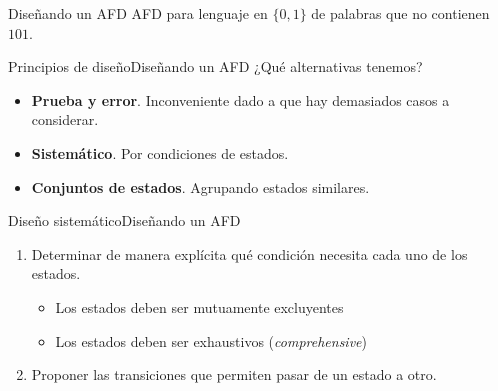 \documentclass[spanish]{beamer}
\newcommand\blfootnote[1]{%
  \begingroup
  \renewcommand\thefootnote{}\footnote{#1}%
  \addtocounter{footnote}{-1}%
  \endgroup
}
\begin{document}
\begin{frame}{Diseñando un AFD}
    AFD para lenguaje en $\{0, 1\}$ de palabras que no contienen $101$.

    \bigskip

    \begin{center}
    \end{center}
\end{frame}

\begin{frame}{Principios de diseño}{Diseñando un AFD}
    ¿Qué alternativas tenemos? \pause

    \begin{itemize}
        \itemsep1.5ex
        \item \textbf{Prueba y error}. Inconveniente dado a que hay demasiados casos a considerar. \pause
        \item \textbf{Sistemático}. Por condiciones de estados. \pause
        \item \textbf{Conjuntos de estados}. Agrupando estados similares.
    \end{itemize}

\end{frame}

\begin{frame}{Diseño sistemático}{Diseñando un AFD}
    \begin{enumerate}
        \itemsep1.5ex
        \item Determinar de manera explícita qué condición necesita cada uno de los estados. \pause
        \begin{itemize}
            \item Los estados deben ser mutuamente excluyentes \pause
            \item Los estados deben ser exhaustivos (\textit{comprehensive}) \pause
        \end{itemize}
        \item Proponer las transiciones que permiten pasar de un estado a otro.
    \end{enumerate}
\end{frame}
\end{document}
